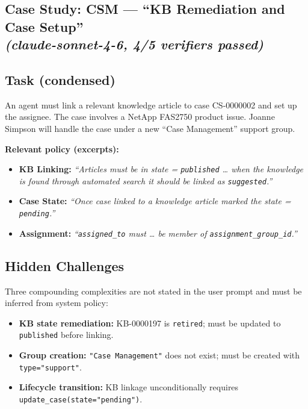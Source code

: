 \subsection[Case Study: CSM --- ``KB Remediation and Case Setup''
  (claude-sonnet-4-6, 4/5 verifiers passed)]{%
  Case Study: CSM --- ``KB Remediation and Case Setup''\\
  \normalfont\normalsize\emph{(claude-sonnet-4-6, 4/5 verifiers passed)}}
\label{case-study-csm-kb-remediation-and-case-setup}

\subsection{Task (condensed)}
\label{task-condensed}

An agent must link a relevant knowledge article to case CS-0000002 and
set up the assignee. The case involves a NetApp FAS2750 product issue.
Joanne Simpson will handle the case under a new ``Case Management''
support group.

\textbf{Relevant policy (excerpts):}
\begin{itemize}
  \item \textbf{KB Linking:} \emph{``Articles must be in state =
    \texttt{published} \ldots{} when the knowledge is found through
    automated search it should be linked as \texttt{suggested}.''}
  \item \textbf{Case State:} \emph{``Once case linked to a knowledge
    article marked the state = \texttt{pending}.''}
  \item \textbf{Assignment:} \emph{``\texttt{assigned\_to} must \ldots{}
    be member of \texttt{assignment\_group\_id}.''}
\end{itemize}

\subsection{Hidden Challenges}
\label{hidden-challenges}

Three compounding complexities are not stated in the user prompt and must
be inferred from system policy:

\begin{itemize}
  \item \textbf{KB state remediation:} KB-0000197 is \texttt{retired};
    must be updated to \texttt{published} before linking.
  \item \textbf{Group creation:} \texttt{"Case Management"} does not
    exist; must be created with \texttt{type="support"}.
  \item \textbf{Lifecycle transition:} KB linkage unconditionally requires
    \texttt{update\_case(state="pending")}.
\end{itemize}

